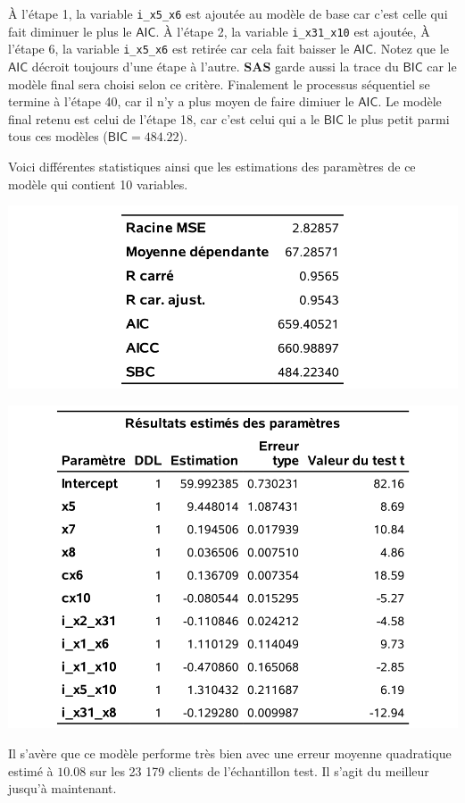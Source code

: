 \documentclass[
  11pt,
  letterpaper,
]{book}
\theoremstyle{definition}
\theoremstyle{definition}
\theoremstyle{definition}
\theoremstyle{remark}
\begin{document}
À l'étape 1, la variable \texttt{i\_x5\_x6} est ajoutée au modèle de base car c'est celle qui fait diminuer le plus le \(\mathsf{AIC}\). À l'étape 2, la variable \texttt{i\_x31\_x10} est ajoutée, À l'étape 6, la variable \texttt{i\_x5\_x6} est retirée car cela fait baisser le \(\mathsf{AIC}\). Notez que le \(\mathsf{AIC}\) décroit toujours d'une étape à l'autre. \textbf{SAS} garde aussi la trace du \(\mathsf{BIC}\) car le modèle final sera choisi selon ce critère. Finalement le processus séquentiel se termine à l'étape 40, car il n'y a plus moyen de faire dimiuer le \(\mathsf{AIC}\). Le modèle final retenu est celui de l'étape 18, car c'est celui qui a le \(\mathsf{BIC}\) le plus petit parmi tous ces modèles (\(\mathsf{BIC}=484.22\)).

Voici différentes statistiques ainsi que les estimations des paramètres de ce modèle qui contient 10 variables.

\begin{center}\includegraphics[width=0.65\linewidth]{figures/02-select-e14} \end{center}

\begin{center}\includegraphics[width=0.7\linewidth]{figures/02-select-e15} \end{center}

Il s'avère que ce modèle performe très bien avec une erreur moyenne quadratique estimé à \(10.08\) sur les 23 179 clients de l'échantillon test. Il s'agit du meilleur jusqu'à maintenant.
\end{document}
